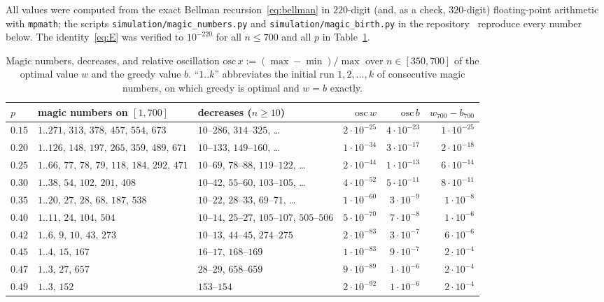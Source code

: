 \documentclass[11pt]{article}
\theoremstyle{definition}
\begin{document}
All values were computed from the exact Bellman
recursion~\eqref{eq:bellman} in $220$-digit (and, as a check,
$320$-digit) floating-point arithmetic with \texttt{mpmath}; the scripts
\texttt{simulation/magic\_numbers.py} and
\texttt{simulation/magic\_birth.py} in the repository~\cite{Repo}
reproduce every number below.  The identity~\eqref{eq:E} was verified
to $10^{-220}$ for all $n\le700$ and all $p$ in Table~\ref{tab:grid}.

\begin{table}[h]
\centering
\footnotesize
\setlength{\tabcolsep}{4pt}
\begin{tabular}{@{}lllrrr@{}}
\toprule
$p$ & magic numbers on $[1,700]$ & decreases ($n\ge10$) &
 $\mathrm{osc}\,w$ & $\mathrm{osc}\,b$ & $w_{700}-b_{700}$ \\
\midrule
$0.15$ & $1..271,\,313,\,378,\,457,\,554,\,673$ & $10$–$286$, $314$–$325$, \dots & $2\cdot10^{-25}$ & $4\cdot10^{-23}$ & $1\cdot10^{-25}$ \\
$0.20$ & $1..126,\,148,\,197,\,265,\,359,\,489,\,671$ & $10$–$133$, $149$–$160$, \dots & $1\cdot10^{-34}$ & $3\cdot10^{-17}$ & $2\cdot10^{-18}$ \\
$0.25$ & $1..66,\,77,\,78,\,79,\,118,\,184,\,292,\,471$ & $10$–$69$, $78$–$88$, $119$–$122$, \dots & $2\cdot10^{-44}$ & $1\cdot10^{-13}$ & $6\cdot10^{-14}$ \\
$0.30$ & $1..38,\,54,\,102,\,201,\,408$ & $10$–$42$, $55$–$60$, $103$–$105$, \dots & $4\cdot10^{-52}$ & $5\cdot10^{-11}$ & $8\cdot10^{-11}$ \\
$0.35$ & $1..20,\,27,\,28,\,68,\,187,\,538$ & $10$–$22$, $28$–$33$, $69$–$71$, \dots & $1\cdot10^{-60}$ & $3\cdot10^{-9}$ & $1\cdot10^{-8}$ \\
$0.40$ & $1..11,\,24,\,104,\,504$ & $10$–$14$, $25$–$27$, $105$–$107$, $505$–$506$ & $5\cdot10^{-70}$ & $7\cdot10^{-8}$ & $1\cdot10^{-6}$ \\
$0.42$ & $1..6,\,9,\,10,\,43,\,273$ & $10$–$13$, $44$–$45$, $274$–$275$ & $2\cdot10^{-83}$ & $3\cdot10^{-7}$ & $6\cdot10^{-6}$ \\
$0.45$ & $1..4,\,15,\,167$ & $16$–$17$, $168$–$169$ & $1\cdot10^{-83}$ & $9\cdot10^{-7}$ & $2\cdot10^{-4}$ \\
$0.47$ & $1..3,\,27,\,657$ & $28$–$29$, $658$–$659$ & $9\cdot10^{-89}$ & $1\cdot10^{-6}$ & $2\cdot10^{-4}$ \\
$0.49$ & $1..3,\,152$ & $153$–$154$ & $2\cdot10^{-92}$ & $1\cdot10^{-6}$ & $2\cdot10^{-4}$ \\
\bottomrule
\end{tabular}
\caption{Magic numbers, decreases, and relative oscillation
  $\mathrm{osc}\,x:=(\max-\min)/\max$ over $n\in[350,700]$ of the
  optimal value $w$ and the greedy value $b$.  ``$1..k$'' abbreviates
  the initial run $1,2,\dots,k$ of consecutive magic numbers, on which
  greedy is optimal and $w=b$ exactly.}\label{tab:grid}
\end{table}
\end{document}
